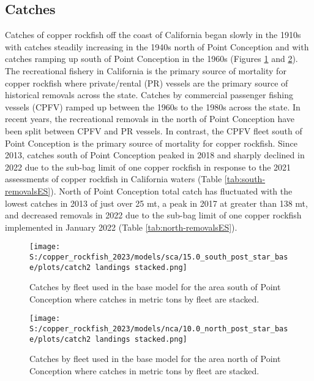 \documentclass[11pt,
  letterpaper,
]{article}
\begin{document}
\subsection*{Catches}\label{catches}

Catches of copper rockfish off the coast of California began slowly in the 1910s with catches steadily increasing in the 1940s north of Point Conception and with catches ramping up south of Point Conception in the 1960s (Figures \ref{fig:es-south-catch} and \ref{fig:es-north-catch}). The recreational fishery in California is the primary source of mortality for copper rockfish where private/rental (PR) vessels are the primary source of historical removals across the state. Catches by commercial passenger fishing vessels (CPFV) ramped up between the 1960s to the 1980s across the state. In recent years, the recreational removals in the north of Point Conception have been split between CPFV and PR vessels. In contrast, the CPFV fleet south of Point Conception is the primary source of mortality for copper rockfish. Since 2013, catches south of Point Conception peaked in 2018 and sharply declined in 2022 due to the sub-bag limit of one copper rockfish in response to the 2021 assessments of copper rockfish in California waters (Table \ref{tab:south-removalsES}). North of Point Conception total catch has fluctuated with the lowest catches in 2013 of just over 25 mt, a peak in 2017 at greater than 138 mt, and decreased removals in 2022 due to the sub-bag limit of one copper rockfish implemented in January 2022 (Table \ref{tab:north-removalsES}).





\begin{figure}
{\centering
\texttt{[image: S:/copper\_rockfish\_2023/models/sca/15.0\_south\_post\_star\_base/plots/catch2 landings stacked.png]}
}
\caption{Catches by fleet used in the base model for the area south of Point Conception where catches in metric tons by fleet are stacked.\label{fig:es-south-catch}}
\end{figure}

\begin{figure}
{\centering
\texttt{[image: S:/copper\_rockfish\_2023/models/nca/10.0\_north\_post\_star\_base/plots/catch2 landings stacked.png]}
}
\caption{Catches by fleet used in the base model for the area north of Point Conception where catches in metric tons by fleet are stacked.\label{fig:es-north-catch}}
\end{figure}
\end{document}
